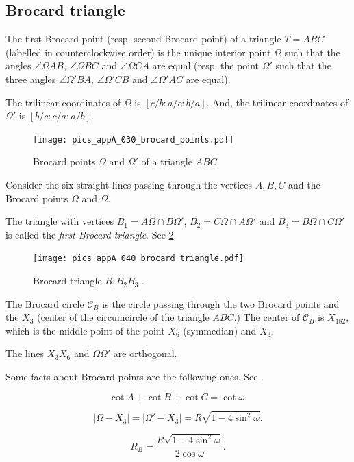  \subsection{Brocard triangle}
 
 The first Brocard point (resp. second Brocard point)  of a triangle $T=ABC$ (labelled in counterclockwise order) is the unique interior point $\Omega$ such that the angles $\angle\Omega AB$,   $\angle\Omega BC$ and  $\angle\Omega CA$  are equal (resp. the point $\Omega'$ such that the three angles $\angle\Omega' BA$,   $\angle\Omega' CB$ and  $\angle\Omega' AC$ are equal).
 
 The trilinear coordinates of $\Omega$ is $[c/b:a/c:b/a].$ And, the trilinear coordinates of $\Omega'$ is $[b/c:c/a:a/b].$
 
 \begin{figure}[H]
      \texttt{[image: pics\_appA\_030\_brocard\_points.pdf]}
    \caption{Brocard points $\Omega$ and $\Omega'$ of a triangle $ABC$.}
    \label{fig:brocard_points}
\end{figure}

Consider the six straight lines passing through the vertices $A,B,C$ and the Brocard points $\Omega$ and $\Omega$.

The triangle with vertices $B_1=A\Omega\cap B\Omega'$, $B_2=C\Omega\cap A\Omega'$ and $B_3=B\Omega\cap C\Omega'$ is called the {\em first Brocard triangle}. See \cref{fig:brocard_triangle}.
 \begin{figure}[H]
    \centering
\texttt{[image: pics\_appA\_040\_brocard\_triangle.pdf]}
    \caption{Brocard triangle $B_1B_2B_3$ .}
    \label{fig:brocard_triangle}
\end{figure}
The Brocard circle $\mathcal{C}_B$ is the circle passing through the two Brocard points and the $X_3$ (center of the circumcircle of the triangle $ABC$.)
The center of $\mathcal{C}_B$ is  $X_{182}$, which is the middle point of  
the point $X_6$ (symmedian) and $X_{3}.$

The lines $X_3X_6$ and $\Omega\Omega'$ are orthogonal.

Some facts about Brocard points are the following ones. See \cite{johnson29}.

\[ \cot A+\cot B+\cot C=\cot \omega.\]

\[ |\Omega-X_3|=|\Omega'-X_3|=R\sqrt{1-4\sin^2\omega}.\]

\[R_B=\frac{R\sqrt{1-4\sin^2\omega}}{2\cos\omega}.\]

